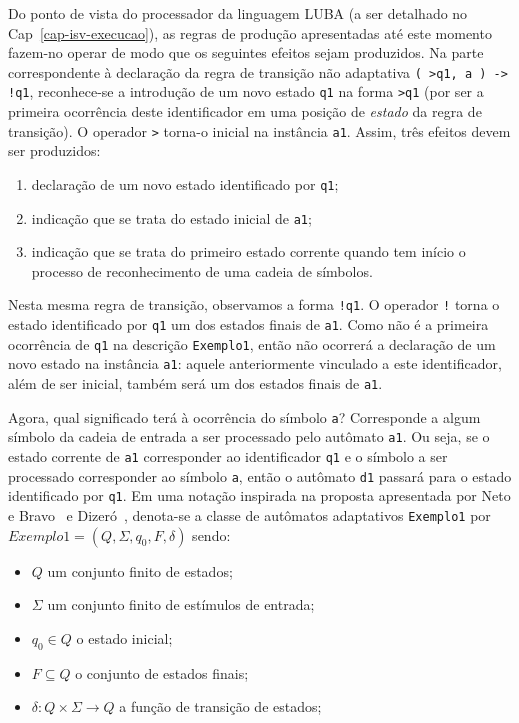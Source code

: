 Do ponto de vista do processador da linguagem LUBA (a ser detalhado no Cap~\ref{cap-isv-execucao}), as regras de produção apresentadas até este momento fazem-no operar de modo que os seguintes efeitos sejam produzidos. Na parte correspondente à declaração da regra de transição não adaptativa \lstinline'( >q1, a ) -> !q1', reconhece-se a introdução de um novo estado \lstinline|q1| na forma \lstinline|>q1| (por ser a primeira ocorrência deste identificador em uma posição de \textit{estado} da regra de transição). O operador \lstinline|>| torna-o inicial na instância \lstinline|a1|. Assim, três efeitos devem ser produzidos:

   \begin{enumerate}

   \item declaração de um novo estado identificado por \lstinline|q1|;

   \item indicação que se trata do estado inicial de \lstinline|a1|;

   \item indicação que se trata do primeiro estado corrente quando tem início o processo de reconhecimento de uma cadeia de símbolos.

   \end{enumerate}

Nesta mesma regra de transição, observamos a forma \lstinline|!q1|. O operador \lstinline|!| torna o estado identificado por \lstinline|q1| um dos estados finais de \lstinline|a1|. Como não é a primeira ocorrência de \lstinline|q1| na descrição \lstinline!Exemplo1!, então não ocorrerá a declaração de um novo estado na instância \lstinline!a1!: aquele anteriormente vinculado a este identificador, além de ser inicial, também será um dos estados finais de \lstinline|a1|.

Agora, qual significado terá à ocorrência do símbolo \lstinline|a|? Corresponde a algum símbolo da cadeia de entrada a ser processado pelo autômato \lstinline|a1|. Ou seja, se o estado corrente de \lstinline|a1| corresponder ao identificador \lstinline|q1| e o símbolo a ser processado corresponder ao símbolo \lstinline|a|, então o autômato \lstinline|d1| passará para o estado identificado por \lstinline|q1|. Em uma notação inspirada na proposta apresentada por Neto e Bravo~\cite{neto:bravo:2002} e Dizeró~\cite{dizero:2010}, denota-se a classe de autômatos adaptativos \lstinline|Exemplo1| por $\mathit{Exemplo1}=(Q, \Sigma, q_0, F, \delta)$ sendo:

	\begin{itemize}
	\item $Q$ um conjunto finito de estados;
	\item $\Sigma$ um conjunto finito de estímulos de entrada;
	\item $q_0 \in Q$ o estado inicial;
	\item $F\subseteq Q$ o conjunto de estados finais;
	\item $\delta:Q\times\Sigma \rightarrow Q$ a função de transição de estados;
	\end{itemize}


